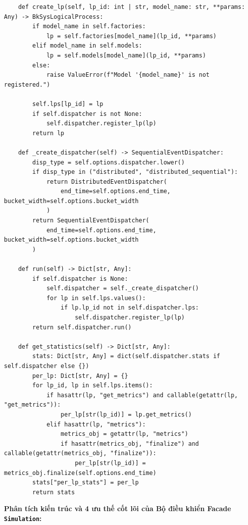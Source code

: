 \begin{lstlisting}
    def create_lp(self, lp_id: int | str, model_name: str, **params: Any) -> BkSysLogicalProcess:
        if model_name in self.factories:
            lp = self.factories[model_name](lp_id, **params)
        elif model_name in self.models:
            lp = self.models[model_name](lp_id, **params)
        else:
            raise ValueError(f"Model '{model_name}' is not registered.")

        self.lps[lp_id] = lp
        if self.dispatcher is not None:
            self.dispatcher.register_lp(lp)
        return lp

    def _create_dispatcher(self) -> SequentialEventDispatcher:
        disp_type = self.options.dispatcher.lower()
        if disp_type in ("distributed", "distributed_sequential"):
            return DistributedEventDispatcher(
                end_time=self.options.end_time, bucket_width=self.options.bucket_width
            )
        return SequentialEventDispatcher(
            end_time=self.options.end_time, bucket_width=self.options.bucket_width
        )

    def run(self) -> Dict[str, Any]:
        if self.dispatcher is None:
            self.dispatcher = self._create_dispatcher()
            for lp in self.lps.values():
                if lp.lp_id not in self.dispatcher.lps:
                    self.dispatcher.register_lp(lp)
        return self.dispatcher.run()

    def get_statistics(self) -> Dict[str, Any]:
        stats: Dict[str, Any] = dict(self.dispatcher.stats if self.dispatcher else {})
        per_lp: Dict[str, Any] = {}
        for lp_id, lp in self.lps.items():
            if hasattr(lp, "get_metrics") and callable(getattr(lp, "get_metrics")):
                per_lp[str(lp_id)] = lp.get_metrics()
            elif hasattr(lp, "metrics"):
                metrics_obj = getattr(lp, "metrics")
                if hasattr(metrics_obj, "finalize") and callable(getattr(metrics_obj, "finalize")):
                    per_lp[str(lp_id)] = metrics_obj.finalize(self.options.end_time)
        stats["per_lp_stats"] = per_lp
        return stats
\end{lstlisting}

\textbf{Phân tích kiến trúc và 4 ưu thế cốt lõi của Bộ điều khiển Facade \texttt{Simulation}:}

